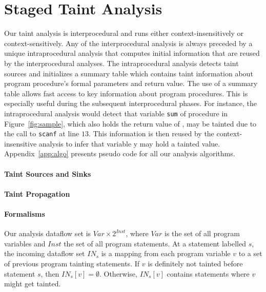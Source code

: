 \section{Staged Taint Analysis}\label{sec:analysis}

\newcommand{\varset}{\mathit{Var}}
\newcommand{\instset}{\mathit{Inst}}
\newcommand{\procset}{\mathit{Proc}}
\newcommand{\formalsset}{\mathit{formals}}
\newcommand{\firstfunc}{\mathit{first}}
\newcommand{\toplevelfunc}{\mathit{toplevel}}
\newcommand{\pointsto}[2]{{pt}_{[#1]}(#2)}
\newcommand{\pointstobefore}[2]{{pt}_{[\overline{#1}]	}(#2)}
\newcommand{\pointstoafter}[2]{{pt}_{[\underline{#1}]}(#2)}

\newcommand{\myinflow}{\mathit{IN}}
\newcommand{\myoutflow}{\mathit{OUT}}
\newcommand{\ifff}{\mathit{iff}}
\newcommand{\aand}{\mathit{and}}
\newcommand{\mybigcup}[2]{\mathlarger{\bigcup_{#1}^{#2}}}

Our taint analysis is interprocedural and runs
either context-insensitively or context-sensitively.
Any of the interprocedural analysis is always preceded
by a unique intraprocedural analysis that computes initial
information that are reused by the interprocedural analyses.
The intraprocedural analysis detects taint sources and
initializes a summary table which contains taint information
about program procedure's formal parameters and return value.
The use of a summary table allows fast access to key
information about program procedures. This is especially
useful during the subsequent interprocedural phases.
For instance, the intraprocedural analysis would
detect that variable \texttt{sum} of procedure \compute{} in
Figure~\ref{fig:sample}, which also holds the return
value of \compute{}, may be tainted due to the call
to \texttt{scanf} at line $13$. This information is then
reused by the context-insensitive analysis to infer that
variable y may hold a tainted value.
Appendix~\ref{app:algo} presents pseudo code for all
our analysis algorithms.

\paragraph{Taint Sources and Sinks}

\paragraph{Taint Propagation}

\paragraph{Formalisms}
Our analysis dataflow set is $\varset \times 2^\instset$,
where $\varset$ is the set of all program variables and
$\instset$ the set of all program statements. 
At a statement labelled $s$, the incoming dataflow set $\myinflow_s$
is a mapping from each program variable $v$ to a set of
previous program tainting statements.
If $v$ is definitely not tainted before statement $s$, then
$\myinflow_s[v] = \emptyset$. Otherwise, $\myinflow_s[v]$
contains statements where $v$ might get tainted.

